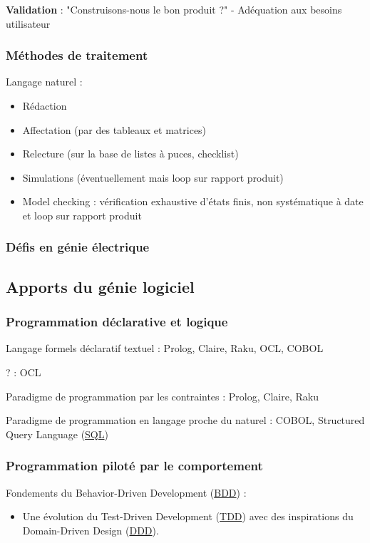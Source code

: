 \documentclass[a4paper,12pt]{article}
\begin{document}
\textbf{Validation} : "Construisons-nous le bon produit ?" - Adéquation aux besoins utilisateur
\subsubsection{Méthodes de traitement}
\label{sec:org320f9ec}
Langage naturel :
\begin{itemize}
\item Rédaction
\item Affectation (par des tableaux et matrices)
\item Relecture (sur la base de listes à puces, checklist)
\item Simulations (éventuellement mais loop sur rapport produit)
\item Model checking : vérification exhaustive d'états finis, non systématique à date et loop sur rapport produit
\end{itemize}
\subsubsection{Défis en génie électrique}
\label{sec:org2dc0018}
\subsection{Apports du génie logiciel}
\label{sec:org5ae2a84}
\subsubsection{Programmation déclarative et logique}
\label{sec:org268be95}
Langage formels déclaratif textuel : Prolog, Claire, Raku, OCL, COBOL

? : OCL

Paradigme de programmation par les contraintes : Prolog, Claire, Raku

Paradigme de programmation en langage proche du naturel : COBOL, Structured Query Language
 (\protect\hyperlink{gls-2}{\label{gls-2-use-1}SQL})
\subsubsection{Programmation piloté par le comportement}
\label{sec:org0ac4e91}
Fondements du Behavior-Driven Development
 (\protect\hyperlink{gls-3}{\label{gls-3-use-1}BDD}) :
\begin{itemize}
\item Une évolution du Test-Driven Development
 (\protect\hyperlink{gls-4}{\label{gls-4-use-1}TDD}) avec des inspirations du Domain-Driven Design
 (\protect\hyperlink{gls-5}{\label{gls-5-use-1}DDD}).
\end{itemize}
\end{document}
